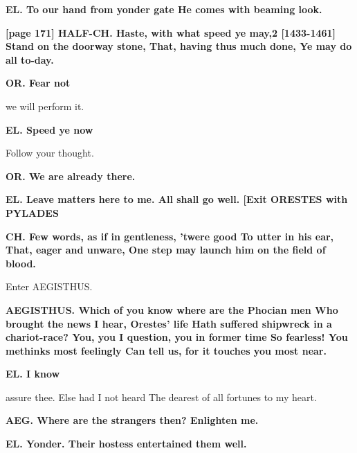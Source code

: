\documentclass[11pt,letter]{book}
\begin{document}
\par \textbf{EL. To our hand from yonder gate He comes with beaming look.}
\par 

\par \textbf{[page 171] HALF-CH. Haste, with what speed ye may,2 [1433-1461] Stand on the doorway stone, That, having thus much done, Ye may do all to-day.}
\par 

\par \textbf{OR. Fear not}
\par   we will perform it.

\par \textbf{EL. Speed ye now}
\par   Follow your thought.

\par \textbf{OR. We are already there.}
\par 

\par \textbf{EL. Leave matters here to me. All shall go well. [Exit ORESTES with PYLADES}
\par 

\par \textbf{CH. Few words, as if in gentleness, ’twere good To utter in his ear, That, eager and unware, One step may launch him on the field of blood.}
\par 

\par  Enter AEGISTHUS.

\par \textbf{AEGISTHUS. Which of you know where are the Phocian men Who brought the news I hear, Orestes’ life Hath suffered shipwreck in a chariot-race? You, you I question, you in former time So fearless! You methinks most feelingly Can tell us, for it touches you most near.}
\par 

\par \textbf{EL. I know}
\par   assure thee. Else had I not heard The dearest of all fortunes to my heart.

\par \textbf{AEG. Where are the strangers then? Enlighten me.}
\par 

\par \textbf{EL. Yonder. Their hostess entertained them well.}
\par 
\end{document}
